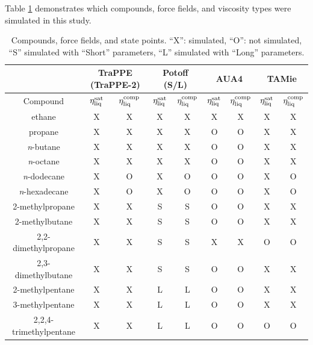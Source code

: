 \documentclass[preprint,review,12pt]{elsarticle}
\begin{document}
	Table \ref{tab:simulations_performed} demonstrates which compounds, force fields, and viscosity types were simulated in this study.
	
	\begin{table}[h!]
		\caption{Compounds, force fields, and state points. ``X'': simulated, ``O'': not simulated, ``S'' simulated with ``Short'' parameters, ``L'' simulated with ``Long'' parameters.} \label{tab:simulations_performed}
		\begin{center}
			\begin{tabular}{|c|c|c|c|c|c|c|c|c|}
				\hline
				\multicolumn{1}{|c}{} & \multicolumn{2}{|c}{TraPPE (TraPPE-2)} & \multicolumn{2}{|c|}{Potoff (S/L)} & \multicolumn{2}{|c}{AUA4} & \multicolumn{2}{|c|}{TAMie}  \\ \hline
				Compound & $\eta_{\rm liq}^{\rm sat}$ & $\eta_{\rm liq}^{\rm comp}$ & $\eta_{\rm liq}^{\rm sat}$ & $\eta_{\rm liq}^{\rm comp}$ & $\eta_{\rm liq}^{\rm sat}$ & $\eta_{\rm liq}^{\rm comp}$ & $\eta_{\rm liq}^{\rm sat}$ & $\eta_{\rm liq}^{\rm comp}$ \\ \hline
				ethane & X & X & X & X & X & X & X & X \\ \hline
				propane & X & X & X & X & O & O & X & X \\ \hline
				\textit{n}-butane & X & X & X & X & O & O & X & X \\ \hline
				\textit{n}-octane & X & X & X & X & O & O & X & X \\ \hline
				\textit{n}-dodecane & X & O & X & O & O & O & X & O \\ \hline
				\textit{n}-hexadecane & X & O & X & O & O & O & X & O \\ \hline
				2-methylpropane & X & X & S & S & O & O & X & X \\ \hline
				2-methylbutane & X & X & S & S & O & O & X & X \\ \hline
				2,2-dimethylpropane & X & X & S & S & X & X & O & O \\ \hline
				2,3-dimethylbutane & X & X & S & S & O & O & X & X \\ \hline
				2-methylpentane & X & X & L & L & O & O & X & X \\ \hline
				3-methylpentane & X & X & L & L & O & O & X & X \\ \hline
				2,2,4-trimethylpentane & X & X & L & L & O & O & O & O \\ \hline
			\end{tabular}
		\end{center} 
	\end{table}
\end{document}
